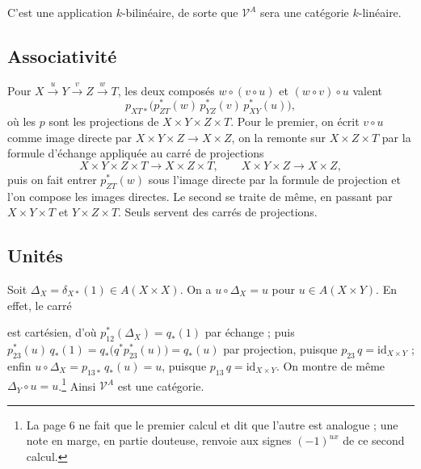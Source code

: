 \documentclass[11pt,a4paper]{article}
\begin{document}

C'est une application $k$-bilinéaire, de sorte que $\mathcal{V}^{A}$ sera une
catégorie $k$-linéaire.

\subsection*{Associativité}

Pour $X \xrightarrow{u} Y \xrightarrow{v} Z \xrightarrow{w} T$, les deux
composés $w \circ (v \circ u)$ et $(w \circ v) \circ u$ valent
\[ p_{XT*}\bigl( p_{ZT}^{*}(w)\, p_{YZ}^{*}(v)\, p_{XY}^{*}(u) \bigr) , \]
où les $p$ sont les projections de $X \times Y \times Z \times T$. Pour le
premier, on écrit $v \circ u$ comme image directe par
$X \times Y \times Z \to X \times Z$, on la remonte sur
$X \times Z \times T$ par la formule d'échange appliquée au carré de
projections
\[ X \times Y \times Z \times T \to X \times Z \times T , \qquad X \times Y \times Z \to X \times Z , \]
puis on fait entrer $p_{ZT}^{*}(w)$ sous l'image directe par la formule de
projection et l'on compose les images directes. Le second se traite de même,
en passant par $X \times Y \times T$ et $Y \times Z \times T$. Seuls servent
des carrés de projections.

\subsection*{Unités}

Soit $\Delta_{X} = \delta_{X*}(1) \in A(X \times X)$. On a
$u \circ \Delta_{X} = u$ pour $u \in A(X \times Y)$. En effet, le carré


est cartésien, d'où $p_{12}^{*}(\Delta_{X}) = q_{*}(1)$ par échange ; puis
$p_{23}^{*}(u)\, q_{*}(1) = q_{*}\bigl(q^{*} p_{23}^{*}(u)\bigr) = q_{*}(u)$
par projection, puisque $p_{23}\, q = \mathrm{id}_{X \times Y}$ ; enfin
$u \circ \Delta_{X} = p_{13*}\, q_{*}(u) = u$, puisque
$p_{13}\, q = \mathrm{id}_{X \times Y}$. On montre de même
$\Delta_{Y} \circ u = u$.\footnote{La page 6 ne fait que le premier calcul et
dit que l'autre est analogue ; une note en marge, en partie douteuse, renvoie
aux signes $(-1)^{ux}$ de ce second calcul.} Ainsi $\mathcal{V}^{A}$ est une
catégorie.
\end{document}
